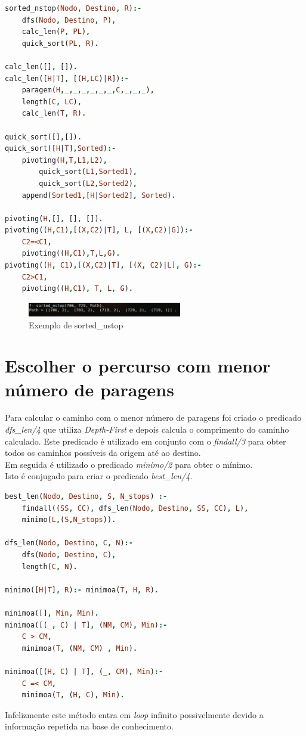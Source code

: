 \documentclass[a4paper]{report}
\begin{document}
\begin{lstlisting}[language=Prolog]
sorted_nstop(Nodo, Destino, R):-
    dfs(Nodo, Destino, P),
    calc_len(P, PL),
    quick_sort(PL, R).

calc_len([], []).
calc_len([H|T], [(H,LC)|R]):-
    paragem(H,_,_,_,_,_,_,C,_,_,_),
    length(C, LC),
    calc_len(T, R).

quick_sort([],[]).
quick_sort([H|T],Sorted):-
	pivoting(H,T,L1,L2),
        quick_sort(L1,Sorted1),
        quick_sort(L2,Sorted2),
	append(Sorted1,[H|Sorted2], Sorted).
   
pivoting(H,[], [], []).
pivoting((H,C1),[(X,C2)|T], L, [(X,C2)|G]):-
    C2=<C1,
    pivoting((H,C1),T,L,G).
pivoting((H, C1),[(X,C2)|T], [(X, C2)|L], G):-
    C2>C1,
    pivoting((H,C1), T, L, G).
\end{lstlisting}

\begin{figure}[H]
    \centering 
    \includegraphics[width=0.6\textwidth]{images/sorted_nstop.png}
    \caption{Exemplo de sorted\_nstop}
\end{figure}

\section{Escolher o percurso com menor número de paragens}
Para calcular o caminho com o menor número de paragens foi criado o predicado
\textit{dfs\_len/4} que utiliza \textit{Depth-First} e depois calcula o
comprimento do caminho calculado. Este predicado é utilizado em conjunto com o
\textit{findall/3} para obter todos os caminhos possíveis da origem até ao
destino.\\
Em seguida é utilizado o predicado \textit{minimo/2} para obter o mínimo.\\
Isto é conjugado para criar o predicado \textit{best\_len/4}.

\begin{lstlisting}[language=Prolog]
best_len(Nodo, Destino, S, N_stops) :-
    findall((SS, CC), dfs_len(Nodo, Destino, SS, CC), L),
    minimo(L,(S,N_stops)).

dfs_len(Nodo, Destino, C, N):-
    dfs(Nodo, Destino, C),
    length(C, N).

minimo([H|T], R):- minimoa(T, H, R).

minimoa([], Min, Min).
minimoa([(_, C) | T], (NM, CM), Min):-
    C > CM,
    minimoa(T, (NM, CM) , Min).

minimoa([(H, C) | T], (_, CM), Min):-
    C =< CM,
    minimoa(T, (H, C), Min).
\end{lstlisting}
Infelizmente este método entra em \textit{loop} infinito possivelmente devido a
informação repetida na base de conhecimento.
\end{document}

